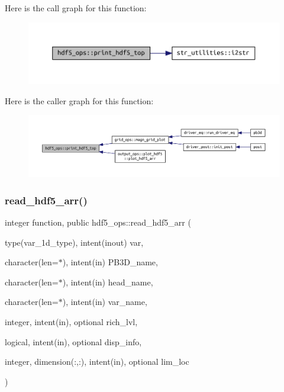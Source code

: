 Here is the call graph for this function\+:\nopagebreak
\begin{figure}[H]
\begin{center}
\leavevmode
\includegraphics[width=350pt]{namespacehdf5__ops_af34b4aea64a8b67ec827aaf4a7425caf_cgraph}
\end{center}
\end{figure}
Here is the caller graph for this function\+:\nopagebreak
\begin{figure}[H]
\begin{center}
\leavevmode
\includegraphics[width=350pt]{namespacehdf5__ops_af34b4aea64a8b67ec827aaf4a7425caf_icgraph}
\end{center}
\end{figure}
\mbox{\label{namespacehdf5__ops_a5108e0d6f6b492cb981505ebceedd9ee}} 
\subsubsection{\texorpdfstring{read\+\_\+hdf5\+\_\+arr()}{read\_hdf5\_arr()}}
{\footnotesize\ttfamily integer function, public hdf5\+\_\+ops\+::read\+\_\+hdf5\+\_\+arr (\begin{DoxyParamCaption}\item[{type(var\+\_\+1d\+\_\+type), intent(inout)}]{var,  }\item[{character(len=$\ast$), intent(in)}]{P\+B3\+D\+\_\+name,  }\item[{character(len=$\ast$), intent(in)}]{head\+\_\+name,  }\item[{character(len=$\ast$), intent(in)}]{var\+\_\+name,  }\item[{integer, intent(in), optional}]{rich\+\_\+lvl,  }\item[{logical, intent(in), optional}]{disp\+\_\+info,  }\item[{integer, dimension(\+:,\+:), intent(in), optional}]{lim\+\_\+loc }\end{DoxyParamCaption})}



